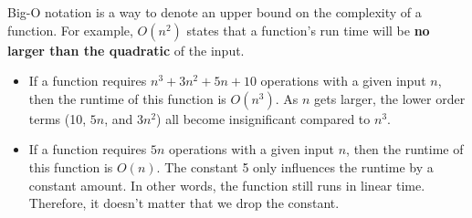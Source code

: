 Big-O notation is a way to denote an upper bound on the complexity of a
function. For example, $O(n^2)$ states that a function's run time will be \textbf{no
larger than the quadratic} of the input.

\begin{blocksection}
\begin{itemize}
\item
If a function requires $n^3 + 3n^2 + 5n + 10$ operations with a given input $n$,
then the runtime of this function is $O(n^3)$. As $n$ gets larger, the lower order terms (10,
$5n$, and $3n^2$) all become insignificant compared to $n^3$.
\item
If a function requires $5n$ operations with a given input $n$, then the runtime
of this function is $O(n)$. The constant 5 only influences the runtime by a constant
amount. In other words, the function still runs in linear time. Therefore, it doesn't
matter that we drop the constant.
\end{itemize}
\end{blocksection}
